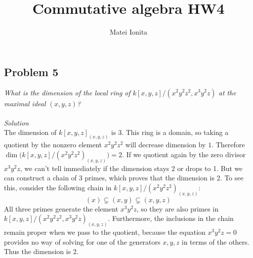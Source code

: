 \documentclass[12 pt]{article}
\title{Commutative algebra HW4}
\author{Matei Ionita}
\begin{document}
  \maketitle

\subsection*{Problem 5}
\emph{What is the dimension of the local ring of $k[x, y, z]/(x^2y^2z^2, x^3y^2z)$ at the maximal ideal $(x, y, z)$?}
\\
\\
\emph{Solution}
\\
The dimension of $k[x,y,z]_{(x,y,z)}$ is 3. This ring is a domain, so taking a quotient by the nonzero element $x^2y^2z^2$ will decrease dimension by $1$. Therefore $\dim\big(k[x,y,z]/(x^2y^2z^2)_{(x,y,z)}\big) = 2$. If we quotient again by the zero divisor $x^3 y^2 z$, we can't tell immediately if the dimension stays 2 or drops to 1. But we can construct a chain of 3 primes, which proves that the dimension is 2. To see this, consider the following chain in $k[x,y,z]/(x^2y^2z^2)_{(x,y,z)}$:
\[       (x) \subsetneq (x,y) \subsetneq (x,y,z)        \]
All three primes generate the element $x^3y^2z$, so they are also primes in $k[x, y, z]/(x^2y^2z^2, x^3y^2z)_{(x,y,z)}$. Furthermore, the inclusions in the chain remain proper when we pass to the quotient, because the equation $ x^3y^2z = 0$ provides no way of solving for one of the generators $x,y,z$ in terms of the others. Thus the dimension is 2.
\end{document}
